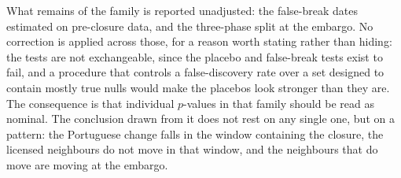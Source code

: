 \documentclass[11pt,a4paper]{article}
\begin{document}
What remains of the family is reported unadjusted: the false-break dates estimated on
pre-closure data, and the three-phase split at the embargo. No correction is applied across
those,
for a reason worth stating rather than hiding: the tests are not exchangeable, since the placebo
and false-break tests exist to fail, and a procedure that controls a false-discovery rate over a
set designed to contain mostly true nulls would make the placebos look stronger than they are.
The consequence is that individual $p$-values in that family should be read as nominal. The
conclusion drawn from it does not rest on any single one, but on a pattern: the Portuguese change
falls in the window containing the closure, the licensed neighbours do not move in that window,
and the neighbours that do move are moving at the embargo.
\end{document}

